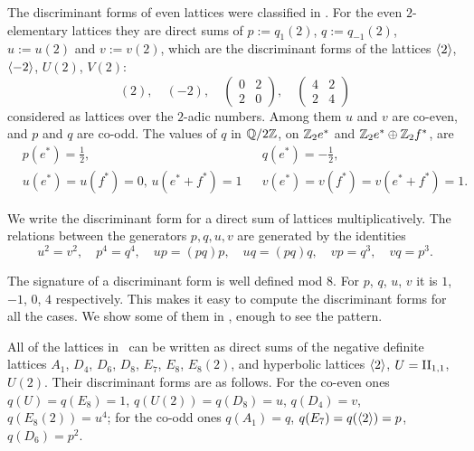 \documentclass{amsart}
\begin{document}
The discriminant forms of even lattices were classified in
\cite{nikulin1979integer-symmetric}. For the even $2$-elementary
lattices they are direct sums of $p:=q_1(2)$, $q:=q_{-1}(2)$,
$u:=u(2)$ and $v:=v(2)$, which are the discriminant forms of the
lattices $\langle 2\rangle$, $\langle -2\rangle$, $U(2)$, $V(2)$:
\begin{displaymath}
  (2), \quad (-2), \quad
  \begin{pmatrix}
    0 & 2 \\ 2 & 0
  \end{pmatrix},
  \quad
  \begin{pmatrix}
    4 & 2 \\ 2 & 4
  \end{pmatrix}
\end{displaymath}
considered as lattices over the $2$-adic numbers.
Among them $u$
and $v$ are co-even, and $p$ and $q$ are co-odd. The values of $q$ in
${\mathbb Q}/2{\mathbb Z}$, on ${\mathbb Z}_2e^*$ and ${\mathbb Z}_2e^*\oplus {\mathbb Z}_2 f^*$, are \begin{align*}
&p(e^*)=\tfrac12,  && q(e^*)=-\tfrac12,   \\ 
&u(e^*)=u(f^*)=0, \,u(e^*+f^*)=1 &&v(e^*)=v(f^*)=v(e^*+f^*)=1. \end{align*}

We write the discriminant form for a direct sum of lattices multiplicatively.
The relations between the generators $p,q,u,v$ are generated by the identities
\begin{displaymath}
  u^2=v^2,\quad p^4=q^4,\quad up = (pq)p,\quad uq = (pq)q,\quad vp=q^3,\quad vq=p^3.
\end{displaymath}

The signature of a discriminant form is well defined mod $8$. For $p$,
$q$, $u$, $v$ it is $1$, $-1$, $0$, $4$ respectively.  This
makes it easy to compute the discriminant forms for all the cases. We
show some of them in \fign, enough to see the pattern. 

All of the lattices in \fign\ can be written as direct sums of 
the negative definite lattices $A_1$, $D_4$, $D_6$, $D_8$, $E_7$, $E_8$, $E_8(2)$, 
and hyperbolic lattices $\langle 2\rangle$, 
$U={\rm II}_{1,1}$, $U(2)$.
Their discriminant forms are as follows. For the co-even ones
$q(U)= q(E_8)=1$, $q(U(2))=q(D_8)=u$, $q(D_4)=v$,
$q(E_8(2))=u^4$; for the co-odd ones $q(A_1)=q$, $q(E_7)=q(\langle 2\rangle)=p$,
$q(D_6)=p^2$.
\end{document}
